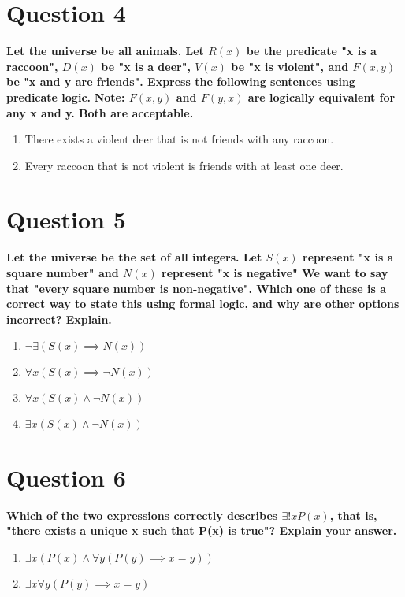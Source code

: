 \documentclass[11pt]{article}
\begin{document}
\clearpage
\section*{Question 4}
    \textbf{Let the universe be all animals. Let \(R(x)\) be the predicate "x is a raccoon", \(D(x)\) be "x is a deer", \(V(x)\) be "x is violent", and \(F(x, y)\) be "x and y are friends". Express the following sentences using predicate logic.}\newline
    \textbf{Note: \(F(x, y)\) and \(F(y, x)\) are logically equivalent for any x and y. Both are acceptable.}
    \begin{enumerate}[label=(\alph*)]
        \item There exists a violent deer that is not friends with any raccoon.
        \item Every raccoon that is not violent is friends with at least one deer.
    \end{enumerate}

\clearpage
\section*{Question 5}
    \textbf{Let the universe be the set of all integers. Let \(S(x)\) represent "x is a square number" and \(N(x)\) represent "x is negative" We want to say that "every square number is non-negative". Which one of these is a correct way to state this using formal logic, and why are other options incorrect? Explain.}
    \begin{enumerate}[label=(\alph*)]
        \item \(\neg \exists (S(x) \implies N(x))\)
        \item \(\forall x(S(x) \implies \neg N(x))\)
        \item \(\forall x(S(x) \land \neg N(x))\)
        \item \(\exists x (S(x) \land \neg N(x))\)
    \end{enumerate}

\clearpage
\section*{Question 6}
    \textbf{Which of the two expressions correctly describes \(\exists !xP(x)\), that is, "there exists a unique x such that P(x) is true"? Explain your answer.}
    \begin{enumerate}[label=(\alph*)]
        \item \(\exists x (P(x) \land \forall y (P(y) \implies x = y))\)
        \item \(\exists x \forall y (P(y) \implies x =y)\)
    \end{enumerate}
\end{document}
